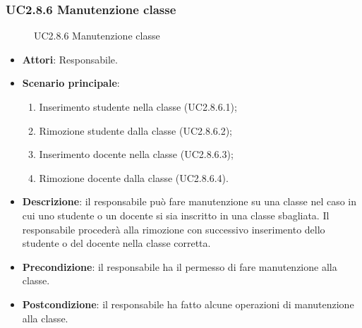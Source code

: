 \subsubsection{UC2.8.6 Manutenzione classe}
\begin{figure}[H]
\centering
\noindent{}
\caption{UC2.8.6 Manutenzione classe}
\end{figure}
\begin{itemize}
\item \textbf{Attori}: Responsabile.
\item \textbf{Scenario principale}:
\begin{enumerate}
\item Inserimento studente nella classe (UC2.8.6.1);
\item Rimozione studente dalla classe (UC2.8.6.2);
\item Inserimento docente nella classe (UC2.8.6.3);
\item Rimozione docente dalla classe (UC2.8.6.4).
\end{enumerate}
\item \textbf{Descrizione}: il responsabile può fare manutenzione su una classe nel caso in cui uno studente o un docente si sia inscritto in una classe sbagliata. Il responsabile procederà alla rimozione con successivo inserimento dello studente o del docente nella classe corretta.
\item \textbf{Precondizione}: il responsabile ha il permesso di fare manutenzione alla classe.
\item \textbf{Postcondizione}: il responsabile ha fatto alcune operazioni di manutenzione alla classe.
\end{itemize}
